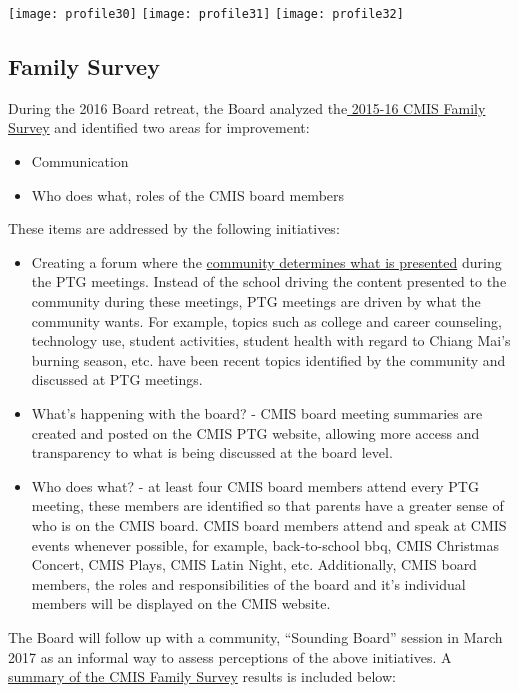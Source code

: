 \texttt{[image: profile30]}
\texttt{[image: profile31]}
\texttt{[image: profile32]}

\subsection{Family Survey}

During the 2016 Board retreat, the Board analyzed the\href{https://docs.google.com/a/cmis.ac.th/forms/d/16Gbd3MzQOXtjjZ2dG460xw5SHG_eohMIKet3lxYUdAY/edit#responses}{ 2015-16 CMIS Family Survey} and identified two areas for improvement:
\begin{itemize}
\item Communication
\item Who does what, roles of the CMIS board members
\end{itemize}


These items are addressed by the following initiatives:
\begin{itemize}
\item Creating a forum where the \href{https://docs.google.com/document/d/1kiwakkg8eKdtEexCxVNx-m1CfC3VqxhukDy8WXDPGKY/edit?ts=58a2a142}{community determines what is presented} during the PTG meetings. Instead of the school driving the content presented to the community during these meetings, PTG meetings are driven by what the community wants. For example, topics such as college and career counseling, technology use, student activities, student health with regard to Chiang Mai’s burning season, etc. have been recent topics identified by the community and discussed at PTG meetings.
\item What’s happening with the board? - CMIS board meeting summaries are created and posted on the CMIS PTG website, allowing more access and transparency to what is being discussed at the board level.
\item Who does what? - at least four CMIS board members attend every PTG meeting, these members are identified so that parents have a greater sense of who is on the CMIS board. CMIS board members attend and speak at CMIS events whenever possible, for example, back-to-school bbq, CMIS Christmas Concert, CMIS Plays, CMIS Latin Night, etc. Additionally, CMIS board members, the roles and responsibilities of the board and it’s individual members will be displayed on the CMIS website.
\end{itemize}

The Board will follow up with a community, “Sounding Board” session in March 2017 as an informal way to assess perceptions of the above initiatives.  A \href{https://docs.google.com/a/cmis.ac.th/document/d/1_otvw47y3Z-1CSjXnKhgRTauVRqPl1S6nSdmsb00O2k/edit?usp=sharing}{summary of the CMIS Family Survey} results is included below:  

